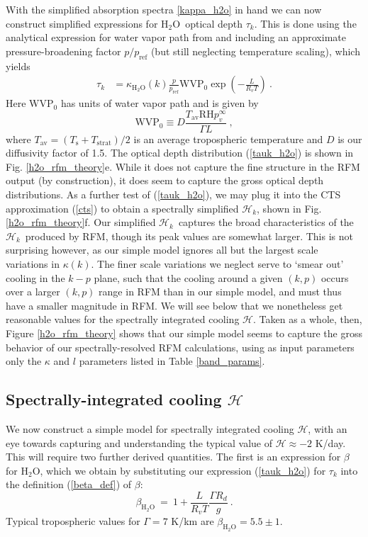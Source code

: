 \documentclass{ametsoc}
\newcommand{\beqn}{\begin{equation}}
\newcommand{\eeqn}{\end{equation}}
\newcommand{\eqnref}[1]{(\ref{#1})}
\newcommand{\comment}[1]{\textcolor{blue}{[{#1}]}}
\newcommand{\Rd}{\ensuremath{R_d}}
\newcommand{\Rv}{\ensuremath{R_v}}
\newcommand{\Ts}{\ensuremath{T_\mathrm{s}}}
\newcommand{\htwo}{\ensuremath{\mathrm{H_2O}}}
\newcommand{\RH}{\ensuremath{\mathrm{RH}}}
\newcommand{\ch}{\ensuremath{\mathcal{H}}}
\newcommand{\chk}{\ensuremath{\ch_k}}
\newcommand{\tauk}{\ensuremath{\tau_k}}
\newcommand{\pref}{\ensuremath{p_{\mathrm{ref}}}}
\newcommand{\WVP}{\ensuremath{\mathrm{WVP}}}
\newcommand{\Tav}{\ensuremath{T_{\mathrm{av}}}}
\newcommand{\Tstrat}{\ensuremath{T_{\mathrm{strat}}}}
\begin{document}
With the simplified absorption spectra \eqref{kappa_h2o} in hand we can now construct simplified expressions for \htwo\  optical depth \tauk. This is done using the analytical expression for water vapor path from  \cite{koll2018} and  including an approximate pressure-broadening factor $p/\pref$ (but still neglecting temperature scaling), which yields
\begin{align}
	 \tauk & = \kappa_{\htwo}(k)\frac{p}{\pref}\WVP_0 \exp\left(-\frac{L}{\Rv T}\right) \ .
	\label{tauk_h2o} 
\end{align}
Here $\WVP_0$ has units of water vapor path and is given by
\beqn
	\WVP_0\equiv D \frac{\Tav \RH p_v^\infty}{\Gamma L}\ ,  
	\label{WVP0}
\eeqn
where $\Tav = (\Ts+\Tstrat)/2$ is an average tropospheric temperature and $D$ is our diffusivity factor of 1.5. 
 The optical depth distribution \eqnref{tauk_h2o} is shown in Fig. \ref{h2o_rfm_theory}e. While it does not capture the fine structure in the RFM output (by construction), it does seem to capture the gross optical depth distributions. As a further test of \eqnref{tauk_h2o}, we may plug it into the CTS approximation \eqnref{cts} to obtain a spectrally simplified \chk, shown in Fig. \ref{h2o_rfm_theory}f. Our simplified \chk\ captures the broad characteristics of the \chk\ produced by RFM, though its peak values are somewhat larger. This is not surprising however, as our simple model ignores all but the largest scale variations in $\kappa(k)$. The finer scale variations we neglect serve to `smear out'  cooling in  the $k-p$ plane, such that the cooling around a given $(k,p)$ occurs over a larger $(k,p)$ range in RFM than in our simple model, and must thus have a smaller magnitude in RFM. We will see below that we nonetheless get reasonable values for the spectrally integrated cooling \ch. Taken as a whole, then, Figure \ref{h2o_rfm_theory} shows that our simple model seems to capture the gross behavior of our spectrally-resolved RFM calculations, using as input parameters only the $\kappa$ and $l$ parameters listed in Table \ref{band_params}.

\subsection{Spectrally-integrated cooling \ch} \label{sec_h2o_integrated}
 We now construct a simple model for spectrally integrated cooling \ch, with an eye towards capturing and understanding the typical value of $\ch\approx -2$ K/day. This will require two further derived quantities. The first is an expression for $\beta$ for \htwo, which we obtain by substituting our expression \eqnref{tauk_h2o} for $\tauk$  into the definition \eqnref{beta_def} of $\beta$:
\beqn
	\beta_{\htwo} \ = \ 1+ \frac{L}{\Rv T}\frac{\Gamma \Rd}{g} \ .
	\label{beta_h2o}
\eeqn
Typical tropospheric values for $\Gamma=7$ K/km are $\beta_{\htwo}=5.5 \pm 1$.
\end{document}

